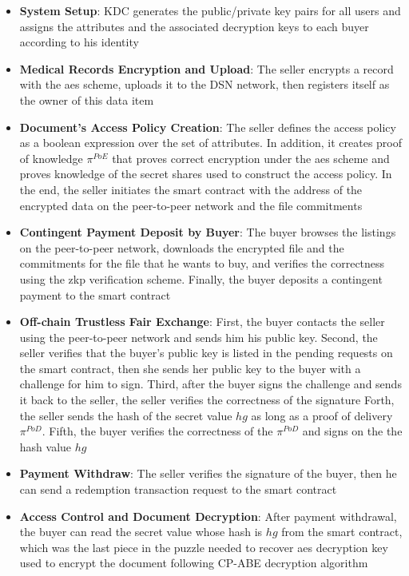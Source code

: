 \begin{itemize}
    \item \textbf{System Setup}: KDC generates the public/private key pairs for all users and assigns the attributes and the associated decryption keys to each buyer according to his identity
    \item \textbf{Medical Records Encryption and Upload}:  The seller encrypts a record with the \ac{aes} scheme, uploads it to the DSN network, then registers itself as the owner of this data item
    \item \textbf{Document's Access Policy Creation}: The seller defines the access policy as a boolean expression over the set of attributes.
    In addition, it creates proof of knowledge $\pi^{PoE}$ that proves correct encryption under the \ac{aes} scheme and proves knowledge of the secret shares used to construct the access policy.
    In the end, the seller initiates the smart contract with the address of the encrypted data on the peer-to-peer network and the file commitments
    \item \textbf{Contingent Payment Deposit by Buyer}: The buyer browses the listings on the peer-to-peer network, downloads the encrypted file and the commitments for the file that he wants to buy, and verifies the correctness using the \ac{zkp} verification scheme.
    Finally, the buyer deposits a contingent payment to the smart contract
    \item \textbf{Off-chain Trustless Fair Exchange}: First, the buyer contacts the seller using the peer-to-peer network and sends him his public key.
    Second, the seller verifies that the buyer's public key is listed in the pending requests on the smart contract, then she sends her public key to the buyer with a challenge for him to sign.
    Third, after the buyer signs the challenge and sends it back to the seller, the seller verifies the correctness of the signature
    Forth, the seller sends the hash of the secret value $hg$ as long as a proof of delivery $\pi^{PoD}$.
    Fifth, the buyer verifies the correctness of the $\pi^{PoD}$ and signs on the the hash value $hg$
    \item \textbf{Payment Withdraw}: The seller verifies the signature of the buyer, then he can send a redemption transaction request to the smart contract
    \item \textbf{Access Control and Document Decryption}: After payment withdrawal, the buyer can read the secret value whose hash is $hg$ from the smart contract, which was the last piece in the puzzle needed to recover \ac{aes} decryption key used to encrypt the document following CP-ABE decryption algorithm
    
\end{itemize}